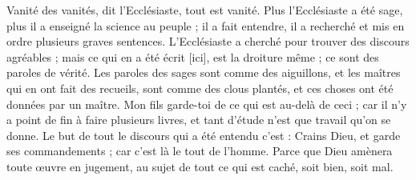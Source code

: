 \begin{multicols}{2}
Vanité des vanités, dit l'Ecclésiaste, tout est vanité.
Plus l'Ecclésiaste a été sage, plus il a enseigné la science au peuple ; il a fait entendre, il a recherché et mis en ordre plusieurs graves sentences. 
L'Ecclésiaste a cherché pour trouver des discours agréables ; mais ce qui en a été écrit [ici], est la droiture même ; ce sont des paroles de vérité. 
Les paroles des sages sont comme des aiguillons, et les maîtres qui en ont fait des recueils, sont comme des clous plantés, et ces choses ont été données par un maître.
Mon fils garde-toi de ce qui est au-delà de ceci ; car il n'y a point de fin à faire plusieurs livres, et tant d'étude n'est que travail qu'on se donne.  
Le but de tout le discours qui a été entendu c'est : Crains Dieu, et garde ses commandements ; car c'est là le tout de l'homme.
Parce que Dieu amènera toute œuvre en jugement, au sujet de tout ce qui est caché, soit bien, soit mal.
\PPE{}
\end{multicols}
